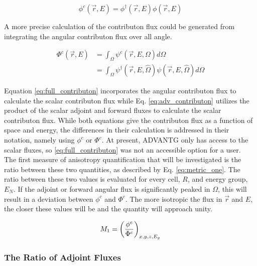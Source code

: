 \begin{equation}
  \phi^{c}(\vec {r} ,E)  = \phi^{\dagger}(\vec {r} ,E)\phi(\vec {r} ,E)
\label{eq:adv_contributon}
\end{equation}

A more precise calculation of the contributon flux could be generated from
integrating the angular contributon flux over all angle.

\begin{equation}
  \begin{split}
    \Phi^{c}(\vec {r} ,E)  & = \int_{\Omega}{\psi^{c}(\vec{r}, E,\Omega)}
                               d\Omega \\
             & = \int_{\Omega}{\psi^{\dagger}(\vec{r}, E, \hat\Omega)
                 \psi(\vec{r}, E, \hat\Omega)} d\Omega
  \end{split}
\label{eq:full_contributon}
\end{equation}

Equation \ref{eq:full_contributon} incorporates the angular contributon flux
to calculate the scalar contributon flux
while Eq. \ref{eq:adv_contributon} utilizes the product of the scalar
adjoint and forward fluxes to calculate the scalar contributon flux. While both
equations give the contributon flux as a function of space and energy, the
differences in their calculation is addressed in their notation, namely using
$\phi^{c}$ or $\Phi^{c}$. At present, ADVANTG only has access to the scalar
fluxes, so \eqref{eq:full_contributon} was not an accessible option for a
user. \\

The first measure of anisotropy quantification that will be investigated is the
ratio between these two quantities, as described by Eq. \ref{eq:metric_one}.
The ratio between these two values is evaluated for every cell, $R$, and energy
group, $E_N$.
If the adjoint or forward angular flux is significantly
peaked in $\Omega$, this will result in a deviation between $\phi^{c}$ and
$\Phi^{c}$. The more isotropic the flux in $\vec{r}$ and $E$, the closer these
values will be and the quantity will approach unity.

\begin{equation}
  M_{1} = \bigg(\frac{\phi^{c}}{\Phi^{c}}\bigg)_{x,y,z,E_g}
  \label{eq:metric_one}
\end{equation}

\subsubsection{The Ratio of Adjoint Fluxes}

